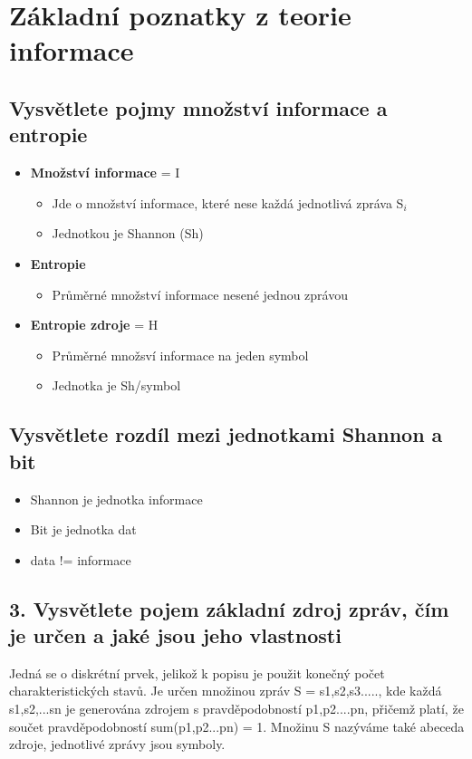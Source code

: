 \clearpage
\section{Základní poznatky z teorie informace}
\subsection{Vysvětlete pojmy množství informace a entropie}
\begin{itemize}
    \item \textbf{Množství informace} = I
    \begin{itemize}
        \item Jde o množství informace, které nese  každá jednotlivá zpráva S$_i$
        \item Jednotkou je Shannon (Sh)
    \end{itemize}
    \item \textbf{Entropie} 
    \begin{itemize}
        \item Průměrné množství informace nesené jednou zprávou
    \end{itemize}
    \item \textbf{Entropie zdroje} = H
    \begin{itemize}
        \item Průměrné množsví informace na jeden symbol
        \item Jednotka je Sh/symbol
    \end{itemize}
\end{itemize}

\subsection{ Vysvětlete rozdíl mezi jednotkami Shannon a bit}
\begin{itemize}
    \item Shannon je jednotka informace
    \item Bit je jednotka dat
    \item data != informace
\end{itemize}

\subsection{3.	Vysvětlete pojem základní zdroj zpráv, čím je určen a jaké jsou jeho vlastnosti}
Jedná se o diskrétní prvek, jelikož k popisu je použit konečný počet charakteristických stavů.
Je určen množinou zpráv S = {s1,s2,s3.....}, kde každá s1,s2,...sn je generována zdrojem s pravděpodobností p1,p2....pn, přičemž platí, že součet pravděpodobností sum(p1,p2...pn) = 1.
Množinu S nazýváme také abeceda zdroje, jednotlivé zprávy jsou symboly.

